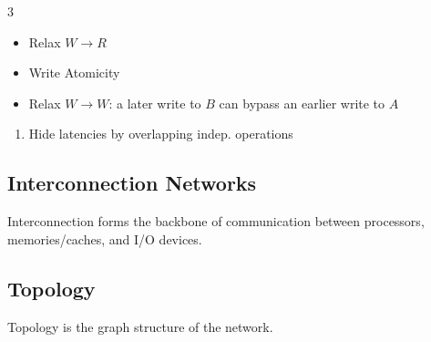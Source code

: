 \documentclass[12pt, a4paper]{article}
\begin{document}
\begin{multicols*}{3}
\begin{enumerate}[\roman*.]
    \begin{itemize}[leftmargin=*]\vspace{3pt}
      \item Relax $W\rightarrow R$
      \item Write Atomicity
      \item Relax $W\rightarrow W$: a later write to $B$ can bypass an earlier write to $A$
    \end{itemize}
\end{enumerate}
\begin{enumerate}[$+$]\vspace{-2pt }
  \item Hide latencies by overlapping indep. operations
\end{enumerate}
\vspace{-1em}
\colbreak
\subsection{Interconnection Networks}
Interconnection forms the backbone of communication between processors, memories/caches, and I/O devices.

\subsection{Topology}
Topology is the graph structure of the network.


\end{multicols*}
\end{document}
